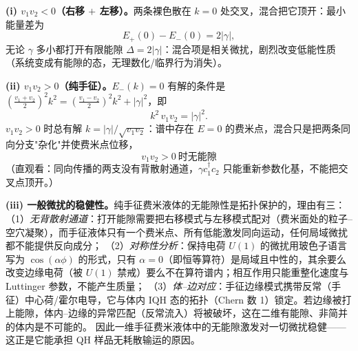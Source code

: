 \textbf{(i) $v_1v_2<0$（右移 $+$ 左移）。}两条裸色散在 $k=0$ 处交叉，混合把它顶开：最小能量差为
\begin{equation*}
E_+(0)-E_-(0)=2|\gamma| ,
\end{equation*}
无论 $\gamma$ 多小都打开有限能隙 $\Delta=2|\gamma|$：混合项是相关微扰，剧烈改变低能性质（系统变成有能隙的态，无理数化/临界行为消失）。

\textbf{(ii) $v_1v_2>0$（纯手征）。}$E_-(k)=0$ 有解的条件是 $(\frac{v_1+v_2}{2})^2k^2=(\frac{v_1-v_2}{2})^2k^2+|\gamma|^2$，即
\begin{equation*}
k^2\,v_1v_2=|\gamma|^2 .
\end{equation*}
$v_1v_2>0$ 时总有解 $k=|\gamma|/\sqrt{v_1v_2}$：谱中存在 $E=0$ 的费米点，混合只是把两条同向分支"杂化"并使费米点位移，
\begin{equation*}
\boxed{\;v_1v_2>0\ \text{时无能隙}\;}
\end{equation*}
（直观看：同向传播的两支没有背散射通道，$\gamma c_1^{\dagger}c_2$ 只能重新参数化基，不能把交叉点顶开。）

\textbf{(iii) 一般微扰的稳健性。}纯手征费米液体的无能隙性是拓扑保护的，理由有三：
（1）\emph{无背散射通道}：打开能隙需要把右移模式与左移模式配对（费米面处的粒子--空穴凝聚），而手征液体只有一个费米点、所有低能激发同向运动，任何局域微扰都不能提供反向成分；
（2）\emph{对称性分析}：保持电荷 $U(1)$ 的微扰用玻色子语言写为 $\cos(\alpha\phi)$ 的形式，只有 $\alpha=0$（即恒等算符）是局域且中性的，其余要么改变边缘电荷（被 $U(1)$ 禁戒）要么不在算符谱内；相互作用只能重整化速度与 Luttinger 参数，不能产生质量；
（3）\emph{体--边对应}：手征边缘模式携带反常（手征）中心荷/霍尔电导，它与体内 IQH 态的拓扑（Chern 数 1）锁定。若边缘被打上能隙，体内--边缘的异常匹配（反常流入）将被破坏，这在二维有能隙、非简并的体内是不可能的。
因此一维手征费米液体中的无能隙激发对一切微扰稳健——这正是它能承担 QH 样品无耗散输运的原因。

